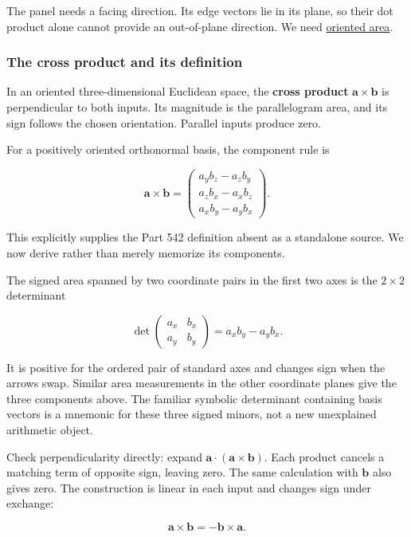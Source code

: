The panel needs a facing direction. Its edge vectors lie in its plane, so their dot product alone cannot provide an out-of-plane direction. We need \hyperref[01-foundations-i-ch017-oriented-area-tells-us-which-side-of-the-panel-is-front]{oriented area}.

\subsubsection{The cross product and its definition}\label{01-foundations-i-ch017-the-cross-product-and-its-definition}

In an oriented three-dimensional Euclidean space, the \textbf{cross product} \(\mathbf a\times\mathbf b\) is perpendicular to both inputs. Its magnitude is the parallelogram area, and its sign follows the chosen orientation. Parallel inputs produce zero.

For a positively oriented orthonormal basis, the component rule is

\[
\mathbf a\times\mathbf b=
\begin{pmatrix}
a_yb_z-a_zb_y\\
a_zb_x-a_xb_z\\
a_xb_y-a_yb_x
\end{pmatrix}.
\]

This explicitly supplies the Part 542 definition absent as a standalone source. We now derive rather than merely memorize its components.

The signed area spanned by two coordinate pairs in the first two axes is the \(2\times2\) determinant

\[
\det\begin{pmatrix}a_x&b_x\\a_y&b_y\end{pmatrix}
=a_xb_y-a_yb_x.
\]

It is positive for the ordered pair of standard axes and changes sign when the arrows swap. Similar area measurements in the other coordinate planes give the three components above. The familiar symbolic determinant containing basis vectors is a mnemonic for these three signed minors, not a new unexplained arithmetic object.

Check perpendicularity directly: expand \(\mathbf a\cdot(\mathbf a\times\mathbf b)\). Each product cancels a matching term of opposite sign, leaving zero. The same calculation with \(\mathbf b\) also gives zero. The construction is linear in each input and changes sign under exchange:

\[
\mathbf a\times\mathbf b=-\mathbf b\times\mathbf a.
\]

